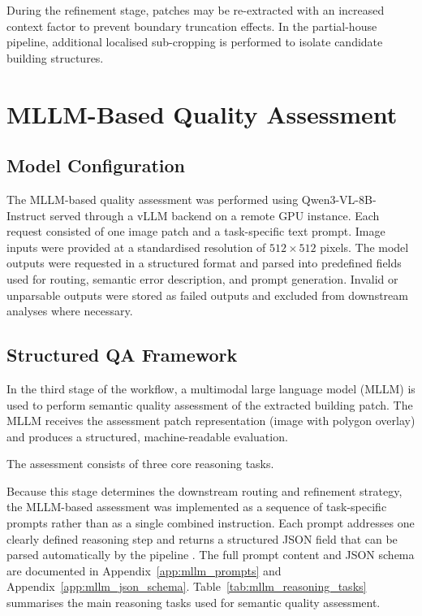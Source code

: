 During the refinement stage, patches may be re-extracted with an increased context factor to prevent boundary truncation effects. In the partial-house pipeline, additional localised sub-cropping is performed to isolate candidate building structures.


\section{MLLM-Based Quality Assessment}

\subsection{Model Configuration}

The MLLM-based quality assessment was performed using Qwen3-VL-8B-Instruct served through a vLLM backend on a remote GPU instance. Each request consisted of one image patch and a task-specific text prompt. Image inputs were provided at a standardised resolution of \(512 \times 512\) pixels. The model outputs were requested in a structured format and parsed into predefined fields used for routing, semantic error description, and prompt generation. Invalid or unparsable outputs were stored as failed outputs and excluded from downstream analyses where necessary.

\subsection{Structured QA Framework}

In the third stage of the workflow, a multimodal large language model (MLLM) is used to perform semantic quality assessment of the extracted building patch. The MLLM receives the assessment patch representation (image with polygon overlay) and produces a structured, machine-readable evaluation.

The assessment consists of three core reasoning tasks.

Because this stage determines the downstream routing and refinement strategy, the MLLM-based assessment was implemented as a sequence of task-specific prompts rather than as a single combined instruction. Each prompt addresses one clearly defined reasoning step and returns a structured JSON field that can be parsed automatically by the pipeline \citep{Zaid_prompt_decompisiton}. The full prompt content and JSON schema are documented in Appendix~\ref{app:mllm_prompts} and Appendix~\ref{app:mllm_json_schema}. Table~\ref{tab:mllm_reasoning_tasks} summarises the main reasoning tasks used for semantic quality assessment.


